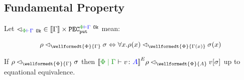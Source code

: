 \documentclass{Report}
\newcommand{\pecputG}[0]{\texttt{PEC}_\put^{\wellformedok{\P}{\G}}}
\newcommand\eLogRel[4]{\logRel{#2}{\wellformedt{#1}{#3}}{#4}}
\newcommand\peLogRel[3]{\eLogRel{\P}{#1}{#2}{#3}}
\newcommand{\fapply}[0]{^E}
\begin{document}
\subsection{Fundamental Property}\label{FundProp}
Let $\relates_{\wellformedok{\P}{\G}} \in \deno{\G}\times \pecputG$ mean:

\begin{equation}
    \label{LogicalRelationTypeEnvironment}
    \peLogRel{\rho}{\G}{\si} \Leftrightarrow \forall x. \peLogRel{\rho(x)}{\G(x)}{\si(x)}
\end{equation}


\begin{theorem}
    If $\peLogRel{\rho}{\G}{\si}$ then $\peLogRel{\deno{\gpetyperelation{v}{A}}\fapply\rho}{A}{v\ssi}$ up to equational equivalence.    
\end{theorem}
\end{document}
